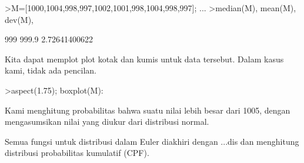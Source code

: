 \documentclass[a4paper,10pt]{article}
\begin{document}
\begin{eulernotebook}
\begin{eulercomment}
\begin{eulercomment}
\begin{eulercomment}
\begin{eulercomment}
\begin{eulercomment}
\begin{eulercomment}
\begin{eulercomment}
\begin{eulercomment}
\begin{eulercomment}
\begin{eulercomment}
\begin{eulercomment}
\begin{eulercomment}
\begin{eulercomment}
\begin{eulercomment}
\begin{eulercomment}
\begin{eulercomment}
\begin{eulercomment}
\begin{eulercomment}
\begin{eulercomment}
\begin{eulercomment}
\begin{eulercomment}
\begin{eulercomment}
\begin{eulercomment}
\begin{eulercomment}
\begin{eulercomment}
\begin{eulercomment}
\begin{eulercomment}
\begin{eulercomment}
\begin{eulercomment}
\begin{eulercomment}
\begin{eulercomment}
\begin{eulercomment}
\begin{eulercomment}
\begin{eulercomment}
\begin{eulercomment}
\begin{eulercomment}
\begin{eulercomment}
\begin{eulercomment}
\begin{eulercomment}
\begin{eulercomment}
\begin{eulercomment}
\begin{eulercomment}
\begin{eulercomment}
\begin{eulercomment}
\begin{eulercomment}
\end{eulercomment}
\begin{eulerprompt}
>M=[1000,1004,998,997,1002,1001,998,1004,998,997]; ...
>median(M), mean(M), dev(M),
\end{eulerprompt}
\begin{euleroutput}
  999
  999.9
  2.72641400622
\end{euleroutput}
\begin{eulercomment}
Kita dapat memplot plot kotak dan kumis untuk data tersebut. Dalam
kasus kami, tidak ada pencilan.
\end{eulercomment}
\begin{eulerprompt}
>aspect(1.75); boxplot(M):
\end{eulerprompt}
\begin{eulercomment}
Kami menghitung probabilitas bahwa suatu nilai lebih besar dari 1005,
dengan mengasumsikan nilai yang diukur dari distribusi normal.

Semua fungsi untuk distribusi dalam Euler diakhiri dengan ...dis dan
menghitung distribusi probabilitas kumulatif (CPF).


\end{eulercomment}
\end{eulercomment}
\end{eulercomment}
\end{eulercomment}
\end{eulercomment}
\end{eulercomment}
\end{eulercomment}
\end{eulercomment}
\end{eulercomment}
\end{eulercomment}
\end{eulercomment}
\end{eulercomment}
\end{eulercomment}
\end{eulercomment}
\end{eulercomment}
\end{eulercomment}
\end{eulercomment}
\end{eulercomment}
\end{eulercomment}
\end{eulercomment}
\end{eulercomment}
\end{eulercomment}
\end{eulercomment}
\end{eulercomment}
\end{eulercomment}
\end{eulercomment}
\end{eulercomment}
\end{eulercomment}
\end{eulercomment}
\end{eulercomment}
\end{eulercomment}
\end{eulercomment}
\end{eulercomment}
\end{eulercomment}
\end{eulercomment}
\end{eulercomment}
\end{eulercomment}
\end{eulercomment}
\end{eulercomment}
\end{eulercomment}
\end{eulercomment}
\end{eulercomment}
\end{eulercomment}
\end{eulercomment}
\end{eulercomment}
\end{eulernotebook}
\end{document}
